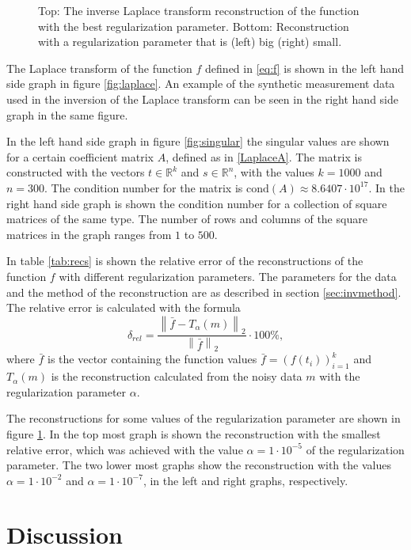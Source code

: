 \documentclass[12pt,a4]{article}
\newcommand{\R}{{\mathbb R}}
\newcommand{\cond}{\ensuremath{\text{cond}}}
\begin{document}
\begin{figure}[h!]
\begin{center}
\end{center}
\caption{Top: The inverse Laplace transform reconstruction of the function with the best regularization parameter. Bottom: Reconstruction with a regularization parameter that is (left) big (right) small.}
\label{fig:reconstruction}
\end{figure}


The Laplace transform of the function $f$ defined in \eqref{eq:f} is shown in the left hand side graph in figure \ref{fig:laplace}. An example of the synthetic measurement data used in the inversion of the Laplace transform can be seen in the right hand side graph in the same figure.

In the left hand side graph in figure \ref{fig:singular} the singular values are shown for a certain coefficient matrix $A$, defined as in \eqref{LaplaceA}. The matrix is constructed with the vectors $t \in \R^k$ and $s \in \R^n$, with the values $k = 1000$ and $n = 300$. The condition number for the matrix is $\cond(A) \approx 8.6407 \cdot 10^{17}$. In the right hand side graph is shown the condition number for a collection of square matrices of the same type. The number of rows and columns of the square matrices in the graph ranges from $1$ to $500$.

In table \ref{tab:recs} is shown the relative error of the reconstructions of the function $f$ with different regularization parameters. The parameters for the data and the method of the reconstruction are as described in section \ref{sec:invmethod}. The relative error is calculated with the formula
\begin{equation}
\delta_{rel} = \frac{\left\| \bar{f} - T_{\alpha}(m) \right\|_2}{\left\| \bar{f} \right\|_2} \cdot 100 \%,
\end{equation}
where $\bar{f}$ is the vector containing the function values $\bar{f} = \left( f(t_i) \right)_{i=1}^k$ and $T_{\alpha}(m)$ is the reconstruction calculated from the noisy data $m$ with the regularization parameter $\alpha$.

The reconstructions for some values of the regularization parameter are shown in figure \ref{fig:reconstruction}. In the top most graph is shown the reconstruction with the smallest relative error, which was achieved with the value $\alpha = 1 \cdot 10^{-5}$ of the regularization parameter. The two lower most graphs show the reconstruction with the values $\alpha = 1 \cdot 10^{-2}$ and $\alpha = 1 \cdot 10^{-7}$, in the left and right graphs, respectively.


\section{Discussion}
\end{document}
